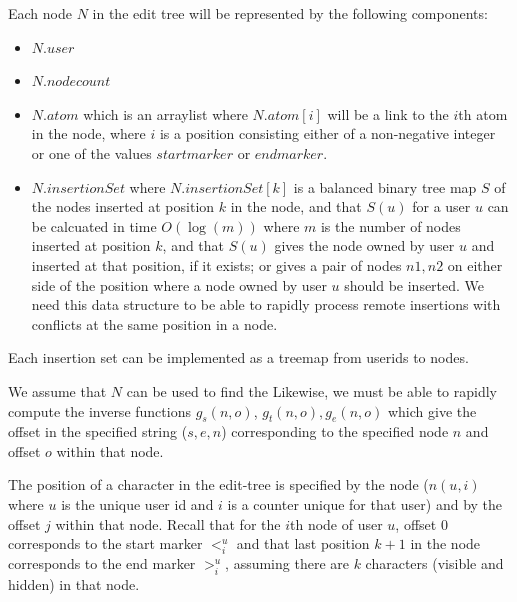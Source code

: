 \documentclass{amsart}
\begin{document}
Each node $N$ in the edit tree will be represented by the following components:
\begin{itemize}
\item $N.user$
\item $N.nodecount$
\item $N.atom$ which is an arraylist where $N.atom[i]$ will be a link to the $i$th atom in the node, where $i$ is a position consisting either of a non-negative integer or one of the values $startmarker$ or $endmarker$.
\item $N.insertionSet$ where $N.insertionSet[k]$ is a balanced binary tree map $S$ of the nodes inserted at position $k$ in the node, and that $S(u)$ for a user $u$ can be calcuated in time $O(\log(m))$ where $m$ is the number of nodes inserted at position $k$, and that $S(u)$ gives the node owned by user $u$ and inserted at that position, if it exists; or gives a pair of nodes $n1,n2$ on either side of the position where a node owned by user $u$ should be inserted. We need this data structure to be able to rapidly process remote insertions with conflicts at the same position in a node. 
\end{itemize}
Each insertion set can be implemented as a treemap from userids to nodes.

We assume that $N$ can be used to find the
Likewise, we must be able to rapidly compute the inverse functions $g_s(n,o)$, $g_t(n,o), g_e(n,o)$ which give the offset in the specified string ($s,e,n$) corresponding to the specified node $n$ and offset $o$ within that node.

The position of a character in the edit-tree is specified by the node ($n(u,i)$ where $u$ is the unique user id and $i$ is a counter unique for that user) and by the offset $j$ within that node. Recall that for the $i$th node of user $u$,  offset 0 corresponds to the start marker $<^u_i$ and that last position $k+1$ in the node corresponds to the end marker $>^u_i$, assuming there are $k$ characters (visible and hidden) in that node.

\end{document}
